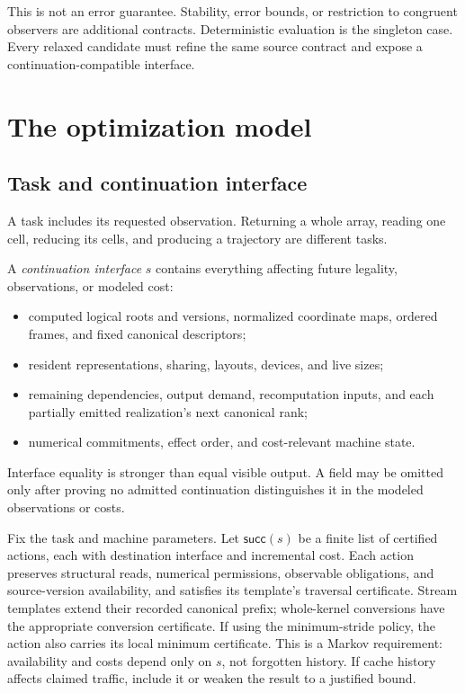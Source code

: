 \documentclass[11pt]{article}
\begin{document}
This is not an error guarantee. Stability, error bounds, or restriction to congruent observers are additional contracts. Deterministic evaluation is the singleton case. Every relaxed candidate must refine the same source contract and expose a continuation-compatible interface.

\section{The optimization model}
\subsection{Task and continuation interface}
A task includes its requested observation. Returning a whole array, reading one cell, reducing its cells, and producing a trajectory are different tasks.

A \emph{continuation interface} $s$ contains everything affecting future legality, observations, or modeled cost:
\begin{itemize}
\item computed logical roots and versions, normalized coordinate maps, ordered frames, and fixed canonical descriptors;
\item resident representations, sharing, layouts, devices, and live sizes;
\item remaining dependencies, output demand, recomputation inputs, and each partially emitted realization's next canonical rank;
\item numerical commitments, effect order, and cost-relevant machine state.
\end{itemize}
Interface equality is stronger than equal visible output. A field may be omitted only after proving no admitted continuation distinguishes it in the modeled observations or costs.

Fix the task and machine parameters. Let $\mathsf{succ}(s)$ be a finite list of certified actions, each with destination interface and incremental cost. Each action preserves structural reads, numerical permissions, observable obligations, and source-version availability, and satisfies its template's traversal certificate. Stream templates extend their recorded canonical prefix; whole-kernel conversions have the appropriate conversion certificate. If using the minimum-stride policy, the action also carries its local minimum certificate. This is a Markov requirement: availability and costs depend only on $s$, not forgotten history. If cache history affects claimed traffic, include it or weaken the result to a justified bound.
\end{document}
